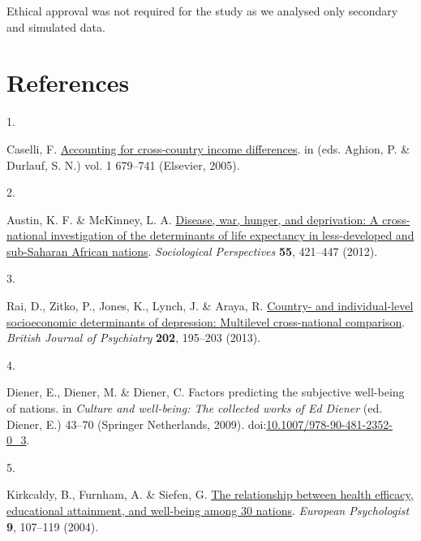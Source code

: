 \documentclass[
  man,floatsintext]{apa6}
\newlength{\cslhangindent}
\newlength{\csllabelwidth}
\newlength{\cslentryspacingunit} %
\newenvironment{CSLReferences}[2] %
 {%
  \setlength{\parindent}{0pt}
  \ifodd #1
  \let\oldpar\par
  \def\par{\hangindent=\cslhangindent\oldpar}
  \fi
  \setlength{\parskip}{#2\cslentryspacingunit}
 }%
 {}
\newcommand{\CSLLeftMargin}[1]{\parbox[t]{\csllabelwidth}{#1}}
\newcommand{\CSLRightInline}[1]{\parbox[t]{\linewidth - \csllabelwidth}{#1}\break}
\begin{document}
Ethical approval was not required for the study as we analysed only secondary and simulated data.

\newpage

\hypertarget{references}{%
\section{References}\label{references}}

\begingroup

\hypertarget{refs}{}
\begin{CSLReferences}{0}{0}
\leavevmode{}%
\CSLLeftMargin{1. }%
\CSLRightInline{Caselli, F. \href{https://doi.org/10.1016/S1574-0684(05)01009-9}{Accounting for cross-country income differences}. in (eds. Aghion, P. \& Durlauf, S. N.) vol. 1 679--741 (Elsevier, 2005).}

\leavevmode{}%
\CSLLeftMargin{2. }%
\CSLRightInline{Austin, K. F. \& McKinney, L. A. \href{https://doi.org/10.1525/sop.2012.55.3.421}{Disease, war, hunger, and deprivation: A cross-national investigation of the determinants of life expectancy in less-developed and sub-{S}aharan {A}frican nations}. \emph{Sociological Perspectives} \textbf{55}, 421--447 (2012).}

\leavevmode{}%
\CSLLeftMargin{3. }%
\CSLRightInline{Rai, D., Zitko, P., Jones, K., Lynch, J. \& Araya, R. \href{https://doi.org/10.1192/bjp.bp.112.112482}{Country- and individual-level socioeconomic determinants of depression: Multilevel cross-national comparison}. \emph{British Journal of Psychiatry} \textbf{202}, 195--203 (2013).}

\leavevmode{}%
\CSLLeftMargin{4. }%
\CSLRightInline{Diener, E., Diener, M. \& Diener, C. Factors predicting the subjective well-being of nations. in \emph{Culture and well-being: The collected works of {E}d {D}iener} (ed. Diener, E.) 43--70 (Springer Netherlands, 2009). doi:\href{https://doi.org/10.1007/978-90-481-2352-0_3}{10.1007/978-90-481-2352-0\_3}.}

\leavevmode{}%
\CSLLeftMargin{5. }%
\CSLRightInline{Kirkcaldy, B., Furnham, A. \& Siefen, G. \href{https://doi.org/10.1027/1016-9040.9.2.107}{The relationship between health efficacy, educational attainment, and well-being among 30 nations}. \emph{European Psychologist} \textbf{9}, 107--119 (2004).}


\end{CSLReferences}
\end{document}
